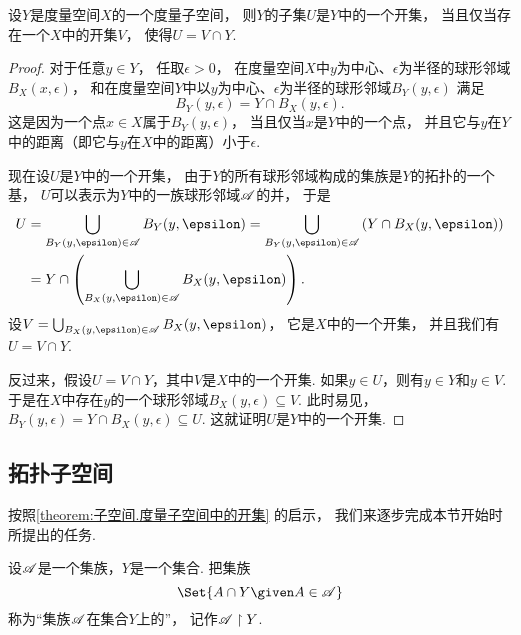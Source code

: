\begin{theorem}\label{theorem:子空间.度量子空间中的开集}
设\(Y\)是度量空间\(X\)的一个度量子空间，
则\(Y\)的子集\(U\)是\(Y\)中的一个开集，
当且仅当存在一个\(X\)中的开集\(V\)，
使得\(U = V \cap Y\).
\begin{proof}
对于任意\(y \in Y\)，
任取\(\epsilon>0\)，
在度量空间\(X\)中\(y\)为中心、\(\epsilon\)为半径的球形邻域\(B_X(x,\epsilon)\)，
和在度量空间\(Y\)中以\(y\)为中心、\(\epsilon\)为半径的球形邻域\(B_Y(y,\epsilon)\)
满足\begin{equation*}
	B_Y(y,\epsilon)
	= Y \cap B_X(y,\epsilon).
\end{equation*}
这是因为一个点\(x \in X\)属于\(B_Y(y,\epsilon)\)，
当且仅当\(x\)是\(Y\)中的一个点，
并且它与\(y\)在\(Y\)中的距离（即它与\(y\)在\(X\)中的距离）小于\(\epsilon\).

现在设\(U\)是\(Y\)中的一个开集，
由于\(Y\)的所有球形邻域构成的集族是\(Y\)的拓扑的一个基，
\(U\)可以表示为\(Y\)中的一族球形邻域\(\mathscr{A}\)的并，
于是\begin{align*}
	U &= \bigcup_{B_Y(y,\epsilon) \in \sfA} B_Y(y,\epsilon)
	= \bigcup_{B_Y(y,\epsilon) \in \sfA} \left( Y \cap B_X(y,\epsilon) \right) \\
	&= Y \cap \left( \bigcup_{B_X(y,\epsilon) \in \sfA} B_X(y,\epsilon) \right).
\end{align*}
设\(V = \bigcup_{B_X(y,\epsilon) \in \sfA} B_X(y,\epsilon)\)，
它是\(X\)中的一个开集，
并且我们有\(U = V \cap Y\).

反过来，假设\(U = V \cap Y\)，其中\(V\)是\(X\)中的一个开集.
如果\(y \in U\)，则有\(y \in Y\)和\(y \in V\).
于是在\(X\)中存在\(y\)的一个球形邻域\(B_X(y,\epsilon) \subseteq V\).
此时易见，\(B_Y(y,\epsilon) = Y \cap B_X(y,\epsilon) \subseteq U\).
这就证明\(U\)是\(Y\)中的一个开集.
\end{proof}
\end{theorem}

\subsection{拓扑子空间}
按照\cref{theorem:子空间.度量子空间中的开集} 的启示，
我们来逐步完成本节开始时所提出的任务.

\begin{definition}\label{definition:子空间.拓扑子空间中的集族的限制}
设\(\mathscr{A}\)是一个集族，\(Y\)是一个集合.
把集族\begin{equation*}
	\Set{ A \cap Y \given A \in \sfA }
\end{equation*}
称为“集族\(\mathscr{A}\)在集合\(Y\)上的”，
记作\(\mathscr{A} \upharpoonright Y\).
\end{definition}

